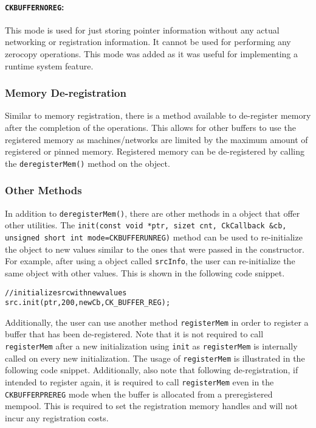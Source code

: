 \paragraph{\texttt{CK\textunderscore BUFFER\textunderscore NOREG}:}
This mode is used for just storing pointer information without any actual networking
or registration information. It cannot be used for performing any zerocopy operations.
This mode was added as it was useful for implementing a runtime system feature.

\subsubsection{Memory De-registration}
Similar to memory registration, there is a method available to de-register
memory after the completion of the operations. This allows for other buffers to use the
registered memory as machines/networks are limited by the maximum amount of registered or
pinned memory. Registered memory can be de-registered by calling the \texttt{deregisterMem()}
method on the  object.

\subsubsection{Other Methods}
In addition to \texttt{deregisterMem()}, there are other methods in a  object
that offer other utilities. The
\texttt{init(const void *ptr, size\textunderscore t cnt, CkCallback \&cb,
unsigned short int mode=CK\textunderscore BUFFER\textunderscore UNREG)}
method can be used to re-initialize the  object to new values similar to the ones that
were passed in the constructor. For example, after using a  object called \texttt{srcInfo},
the user can re-initialize the same object with other values. This is shown in the following code snippet.

\begin{alltt}
// initialize src with new values
src.init(ptr, 200, newCb, CK_BUFFER_REG);
\end{alltt}

Additionally, the user can use another method \texttt{registerMem} in order to register a buffer that has
been de-registered. Note that it is not required to call \texttt{registerMem} after a new initialization
using \texttt{init} as \texttt{registerMem} is internally called on every new initialization. The usage of
\texttt{registerMem} is illustrated in the following code snippet. Additionally, also note that following
de-registration, if intended to register again, it is required to call \texttt{registerMem} even in the
\texttt{CK\textunderscore BUFFER\textunderscore PREREG} mode when the buffer is allocated from a preregistered
mempool. This is required to set the registration memory handles and will not incur any registration costs.


